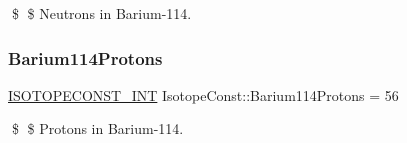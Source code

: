 \$ \$ Neutrons in Barium-\/114. \mbox{\label{group___isotope_const-_barium-_ba114_ga2bcaf1f915474709f0abc53e60bd5f71}} 
\subsubsection{\texorpdfstring{Barium114\+Protons}{Barium114Protons}}
{\footnotesize\ttfamily \mbox{\hyperlink{group___isotope_const-_macros_ga5f18360b3e99483a35c32d789e62621c}{I\+S\+O\+T\+O\+P\+E\+C\+O\+N\+S\+T\+\_\+\+I\+NT}} Isotope\+Const\+::\+Barium114\+Protons = 56}

\$ \$ Protons in Barium-\/114. 